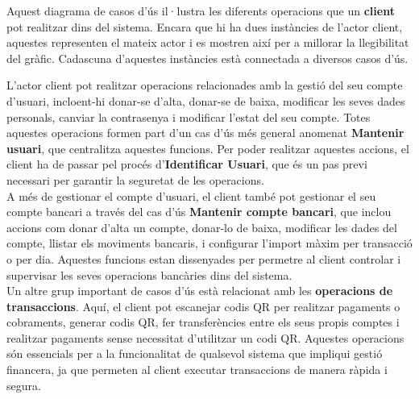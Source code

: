\documentclass[a4paper,12pt,twoside]{ThesisStyle}
\begin{document}
Aquest diagrama de casos d'ús il·lustra les diferents operacions que un \textbf{client} pot realitzar dins del sistema. Encara que hi ha dues instàncies de l'actor client, aquestes representen el mateix actor i es mostren així per a millorar la llegibilitat del gràfic. Cadascuna d'aquestes instàncies està connectada a diversos casos d'ús.

L'actor client pot realitzar operacions relacionades amb la gestió del seu compte d'usuari, incloent-hi donar-se d'alta, donar-se de baixa, modificar les seves dades personals, canviar la contrasenya i modificar l'estat del seu compte. Totes aquestes operacions formen part d'un cas d'ús més general anomenat \textbf{Mantenir usuari}, que centralitza aquestes funcions. Per poder realitzar aquestes accions, el client ha de passar pel procés d'\textbf{Identificar Usuari}, que és un pas previ necessari per garantir la seguretat de les operacions.\\

A més de gestionar el compte d'usuari, el client també pot gestionar el seu compte bancari a través del cas d'ús \textbf{Mantenir compte bancari}, que inclou accions com donar d'alta un compte, donar-lo de baixa, modificar les dades del compte, llistar els moviments bancaris, i configurar l'import màxim per transacció o per dia. Aquestes funcions estan dissenyades per permetre al client controlar i supervisar les seves operacions bancàries dins del sistema.\\

Un altre grup important de casos d'ús està relacionat amb les \textbf{operacions de transaccions}. Aquí, el client pot escanejar codis QR per realitzar pagaments o cobraments, generar codis QR, fer transferències entre els seus propis comptes i realitzar pagaments sense necessitat d'utilitzar un codi QR. Aquestes operacions són essencials per a la funcionalitat de qualsevol sistema que impliqui gestió financera, ja que permeten al client executar transaccions de manera ràpida i segura.\\
\end{document}
